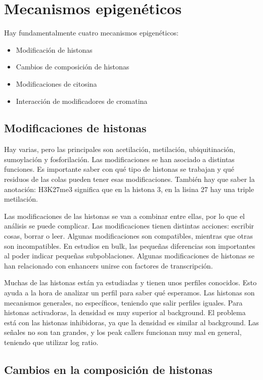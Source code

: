 \section{Mecanismos epigenéticos}
Hay fundamentalmente cuatro mecanismos epigenéticos:
\begin{itemize}
\item Modificación de histonas
\item Cambios de composición de histonas
\item Modificaciones de citosina
\item Interacción de modificadores de cromatina
\end{itemize}

\subsection{Modificaciones de histonas}
Hay varias, pero las principales son acetilación, metilación, ubiquitinación, sumoylación y fosforilación. Las modificaciones se han asociado a distintas funciones. Es importante saber con qué tipo de histonas se trabajan y qué residuos de las colas pueden tener esas modificaciones. También hay que saber la anotación: H3K27me3 significa que en la histona 3, en la lisina 27 hay una triple metilación. 

Las modificaciones de las histonas se van a combinar entre ellas, por lo que el análisis se puede complicar. Las modificaciones tienen distintas acciones: escribir cosas, borrar o leer. Algunas modificaciones son compatibles, mientras que otras son incompatibles. En estudios en bulk, las pequeñas diferencias son importantes al poder indicar pequeñas subpoblaciones. Algunas modificaciones de histonas se han relacionado con enhancers unirse con factores de transcripción. 

Muchas de las histonas están ya estudiadas y tienen unos perfiles conocidos. Esto ayuda a la hora de analizar un perfil para saber qué esperamos. Las histonas son mecanismos generales, no específicos, teniendo que salir perfiles iguales. Para histonas activadoras, la densidad es muy superior al background. El problema está con las histonas inhibidoras, ya que la densidad es similar al background. Las señales no son tan grandes, y los peak callers funcionan muy mal en general, teniendo que utilizar log ratio. 

\subsection{Cambios en la composición de histonas}